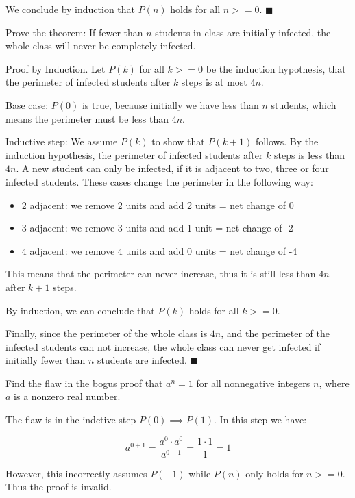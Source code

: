 \documentclass[../main.tex]{subfiles}
\begin{document}
\begin{questions}
\begin{solution}
  We conclude by induction that $P(n)$ holds for all $n >= 0$. $\blacksquare$
\end{solution}

\question Prove the theorem: If fewer than $n$ students in class are initially infected, the whole class will never be completely infected.
\begin{solution}
  Proof by Induction. Let $P(k)$ for all $k >= 0$ be the induction hypothesis, that the perimeter of infected students after $k$ steps is at most $4n$.

  Base case: $P(0)$ is true, because initially we have less than $n$ students, which means the perimeter must be less than $4n$.

  Inductive step: We assume $P(k)$ to show that $P(k+1)$ follows. By the induction hypothesis, the perimeter of infected students after $k$ steps is less than $4n$. A new student can only be infected, if it is adjacent to two, three or four infected students. These cases change the perimeter in the following way:

  \begin{itemize}
    \item 2 adjacent: we remove 2 units and add 2 units = net change of 0
    \item 3 adjacent: we remove 3 units and add 1 unit = net change of -2
    \item 4 adjacent: we remove 4 units and add 0 units = net change of -4
  \end{itemize}
  This means that the perimeter can never increase, thus it is still less than $4n$ after $k+1$ steps.

  By induction, we can conclude that $P(k)$ holds for all $k >= 0$.

  Finally, since the perimeter of the whole class is $4n$, and the perimeter of the infected students can not increase, the whole class can never get infected if initially fewer than $n$ students are infected. $\blacksquare$
\end{solution}

\question Find the flaw in the bogus proof that $a^n=1$ for all nonnegative integers $n$, where $a$ is a nonzero real number.

\begin{solution}

  The flaw is in the indctive step $P(0) \implies P(1)$. In this step we have:

  $$
  a^{0+1}=\frac{a^0 \cdot a^0}{a^{0-1}} = \frac{1 \cdot 1}{1} = 1
  $$

  However, this incorrectly assumes $P(-1)$ while $P(n)$ only holds for $n >= 0$. Thus the proof is invalid.
\end{solution}

\end{questions}
\end{document}
